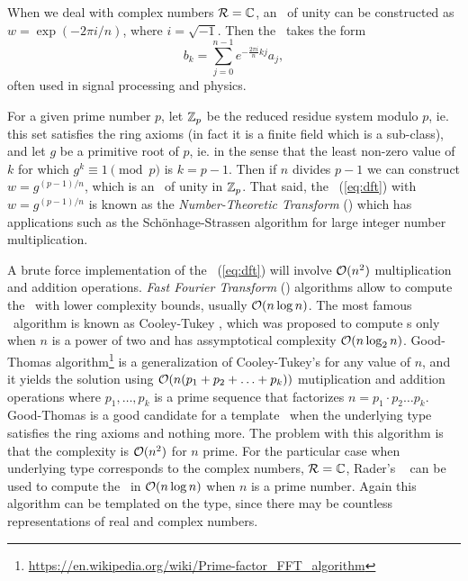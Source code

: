 \begin{example}
    When we deal with complex numbers $\mathcal{R} = \mathbb{C}$, an \ of unity
    can be constructed as $w = \exp(- 2 \pi i/n)$, where $i = \sqrt{-1}$.
    Then the \dft\ takes the form
    \begin{equation} 
        b_k = \sum_{j=0}^{n-1} e^{-\frac{2\pi i}{n} kj}  a_j,
    \end{equation}
    often used in signal processing and physics.
    \label{ex:complex}
\end{example}

\begin{example}
   For a given prime number $p$, let $\mathbb{Z}_p$ be the reduced residue system
   modulo $p$, ie. this set satisfies the ring axioms (in fact it is a finite
   field which is a sub-class), and let $g$ be a primitive root of $p$, ie. in the
   sense that the least non-zero value of $k$ for which $g^k \equiv 1 \pmod p$ is
   $k=p-1$. Then if $n$ divides $p-1$ we can construct $w = g^{(p-1)/n}$, which
   is an \ of unity in $\mathbb{Z}_p$. That said, the \dft\
   (\ref{eq:dft}) with $w = g^{(p-1)/n}$ is known as the \emph{Number-Theoretic
   Transform} (\ntt) which has applications such as the Sch\"onhage-Strassen
   algorithm for large integer number multiplication.
   \label{ex:ntt}
\end{example}

A brute force implementation of the \dft\ (\ref{eq:dft}) will involve
$\mathcal{O}(n^2)$ multiplication and addition operations.
\emph{Fast Fourier Transform} (\fft) algorithms allow to compute the \dft\ with
lower complexity bounds, usually $\mathcal{O}(n \log n)$.
The most famous \fft\ algorithm is known as Cooley-Tukey \cite{cooley65}, which
was proposed to compute \fft{}s only when $n$ is a power of two and has
assymptotical complexity $\mathcal{O}(n \log_2 n)$.
Good-Thomas 
algorithm\footnote{\url{https://en.wikipedia.org/wiki/Prime-factor_FFT_algorithm}}
is a generalization of Cooley-Tukey's for any value of $n$, and it yields the
solution using $\mathcal{O}(n (p_1 + p_2 + \ldots + p_k) )$ mutiplication and
addition operations where $p_1,\ldots,p_k$ is a prime sequence that factorizes $n = p_1\cdot
p_2 \ldots p_k$. 
Good-Thomas is a good candidate for a template \fft\ when the
underlying type satisfies the ring axioms and nothing more.
The problem with this algorithm is that the complexity is $\mathcal{O}(n^2)$ for $n$
prime. For the particular case when underlying type corresponds to the complex numbers, 
$\mathcal{R} = \mathbb{C}$, 
Rader's \fft\ \cite{rader68}
can be used to compute the \dft\ in $\mathcal{O}(n\log n)$ when $n$ is a prime
number. Again this algorithm can be templated on the type, since there may be
countless representations of real and complex numbers.

